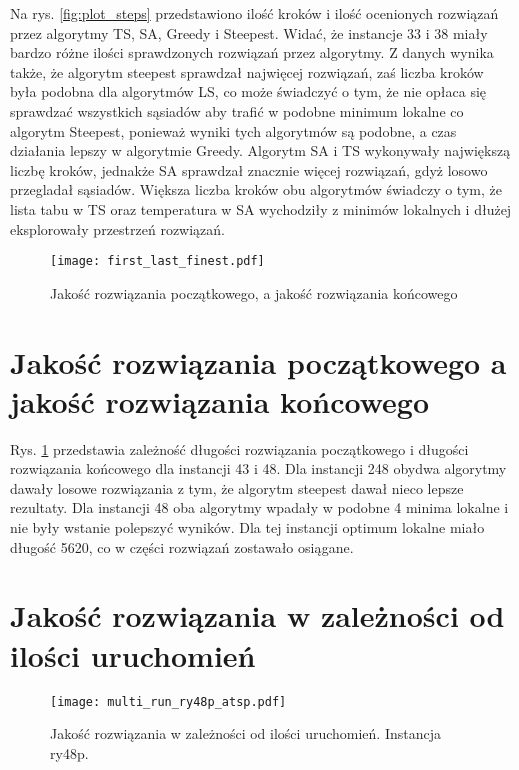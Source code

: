 \documentclass{article}
\begin{document}
Na rys. \ref{fig:plot_steps} przedstawiono ilość kroków i ilość ocenionych rozwiązań przez algorytmy TS, SA, Greedy i Steepest. Widać, że instancje 33 i 38 miały bardzo różne ilości sprawdzonych rozwiązań przez algorytmy. Z danych wynika także, że algorytm steepest sprawdzał najwięcej rozwiązań, zaś liczba kroków była podobna dla algorytmów LS, co może świadczyć o tym, że nie opłaca się sprawdzać wszystkich sąsiadów aby trafić w podobne minimum lokalne co algorytm Steepest, ponieważ wyniki tych algorytmów są podobne, a czas działania lepszy w algorytmie Greedy.
Algorytm SA i TS wykonywały największą liczbę kroków, jednakże SA sprawdzał znacznie więcej rozwiązań, gdyż losowo przegladał sąsiadów. Większa liczba kroków obu algorytmów świadczy o tym, że lista tabu w TS oraz temperatura w SA wychodziły z minimów lokalnych i dłużej eksplorowały przestrzeń rozwiązań.

\begin{figure}[H]
    \begin{center}
        \texttt{[image: first\_last\_finest.pdf]}
    \end{center}
    \caption{Jakość rozwiązania początkowego, a jakość rozwiązania końcowego}
    \label{fig:first_finnest}
\end{figure}


\section{Jakość rozwiązania początkowego a jakość rozwiązania końcowego}

Rys. \ref{fig:first_finnest} przedstawia zależność długości rozwiązania początkowego i długości rozwiązania końcowego dla instancji 43 i 48. Dla instancji 248 obydwa algorytmy dawały losowe rozwiązania z tym, że algorytm steepest dawał nieco lepsze rezultaty. Dla instancji 48 oba algorytmy wpadały w podobne 4 minima lokalne i nie były wstanie polepszyć wyników. Dla tej instancji optimum lokalne miało długość 5620, co w części rozwiązań zostawało osiągane.

\section{Jakość rozwiązania w zależności od ilości uruchomień}

\begin{figure}
    \begin{center}
        \texttt{[image: multi\_run\_ry48p\_atsp.pdf]}
    \end{center}
    \caption{Jakość rozwiązania w zależności od ilości uruchomień. Instancja ry48p.}
    \label{fig:plot_multi_run_ry48p}
\end{figure}
\end{document}
